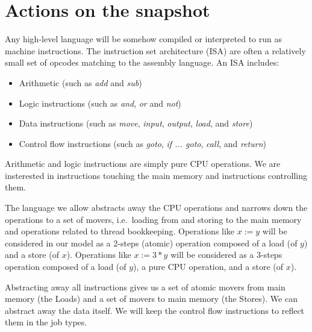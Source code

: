 \section{Actions on the snapshot}

Any high-level language will be somehow compiled or interpreted to run
as machine instructions. The instruction set architecture (ISA) are
often a relatively small set of opcodes matching to the assembly
language. An ISA includes:
\begin{itemize}
\item Arithmetic (such as \emph{add} and \emph{sub})
\item Logic instructions (such as \emph{and}, \emph{or} and \emph{not})
\item Data instructions (such as \emph{move}, \emph{input}, \emph{output}, \emph{load}, and \emph{store})
\item Control flow instructions (such as \emph{goto}, \emph{if ... goto}, \emph{call}, and \emph{return})
\end{itemize}

Arithmetic and logic instructions are simply pure CPU operations. We
are insterested in instructions touching the main memory and
instructions controlling them.

The language we allow abstracts away the CPU operations and narrows
down the operations to a set of movers, i.e.\ loading from and storing
to the main memory and operations related to thread
bookkeeping. Operations like $x:=y$ will be considered in our model as
a 2-steps (atomic) operation composed of a load (of $y$) and a store
(of $x$). Operations like $x:=3*y$ will be considered as a 3-steps
operation composed of a load (of $y$), a pure CPU operation, and a
store (of $x$).

Abstracting away all instructions gives us a set of atomic movers from
main memory (the Loads) and a set of movers to main memory (the
Stores). We can abstract away the data itself. We will keep the
control flow instructions to reflect them in the job types.


